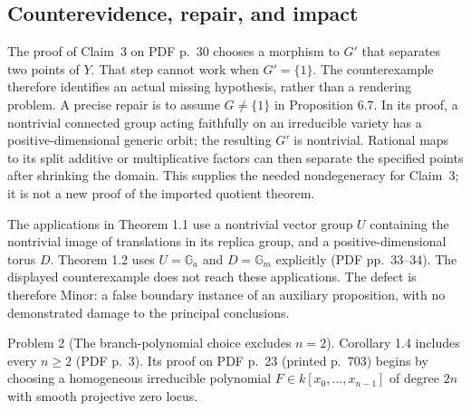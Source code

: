 \documentclass[10pt]{article}
\begin{document}
\subsection*{Counterevidence, repair, and impact}
The proof of Claim 3 on PDF p. 30 chooses a morphism to \(G'\) that separates two points of \(Y\). That step cannot work when \(G'=\{1\}\). The counterexample therefore identifies an actual missing hypothesis, rather than a rendering problem. A precise repair is to assume \(G\ne\{1\}\) in Proposition 6.7. In its proof, a nontrivial connected group acting faithfully on an irreducible variety has a positive-dimensional generic orbit; the resulting \(G'\) is nontrivial. Rational maps to its split additive or multiplicative factors can then separate the specified points after shrinking the domain. This supplies the needed nondegeneracy for Claim 3; it is not a new proof of the imported quotient theorem.\par
The applications in Theorem 1.1 use a nontrivial vector group \(U\) containing the nontrivial image of translations in its replica group, and a positive-dimensional torus \(D\). Theorem 1.2 uses \(U=\mathbb G_a\) and \(D=\mathbb G_m\) explicitly (PDF pp. 33–34). The displayed counterexample does not reach these applications. The defect is therefore Minor: a false boundary instance of an auxiliary proposition, with no demonstrated damage to the principal conclusions.\par
Problem 2 (The branch-polynomial choice excludes \(n=2\)).  Corollary 1.4 includes every \(n\ge2\) (PDF p. 3). Its proof on PDF p. 23 (printed p. 703) begins by choosing a homogeneous irreducible polynomial \(F\in k[x_0,\ldots,x_{n-1}]\) of degree \(2n\) with smooth projective zero locus.\par
\end{document}
